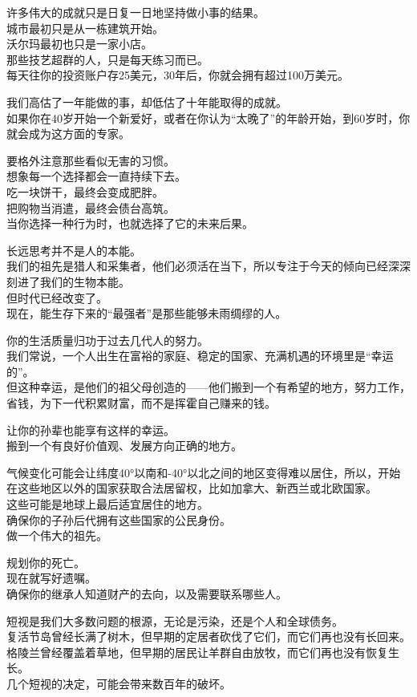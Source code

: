 \documentclass[
]{article}
\begin{document}
许多伟大的成就只是日复一日地坚持做小事的结果。\\
城市最初只是从一栋建筑开始。\\
沃尔玛最初也只是一家小店。\\
那些技艺超群的人，只是每天练习而已。\\
每天往你的投资账户存25美元，30年后，你就会拥有超过100万美元。

我们高估了一年能做的事，却低估了十年能取得的成就。\\
如果你在40岁开始一个新爱好，或者在你认为``太晚了''的年龄开始，到60岁时，你就会成为这方面的专家。

要格外注意那些看似无害的习惯。\\
想象每一个选择都会一直持续下去。\\
吃一块饼干，最终会变成肥胖。\\
把购物当消遣，最终会债台高筑。\\
当你选择一种行为时，也就选择了它的未来后果。

长远思考并不是人的本能。\\
我们的祖先是猎人和采集者，他们必须活在当下，所以专注于今天的倾向已经深深刻进了我们的生物本能。\\
但时代已经改变了。\\
现在，能生存下来的``最强者''是那些能够未雨绸缪的人。

你的生活质量归功于过去几代人的努力。\\
我们常说，一个人出生在富裕的家庭、稳定的国家、充满机遇的环境里是``幸运的''。\\
但这种幸运，是他们的祖父母创造的------他们搬到一个有希望的地方，努力工作，省钱，为下一代积累财富，而不是挥霍自己赚来的钱。

让你的孙辈也能享有这样的幸运。\\
搬到一个有良好价值观、发展方向正确的地方。

气候变化可能会让纬度40°以南和-40°以北之间的地区变得难以居住，所以，开始在这些地区以外的国家获取合法居留权，比如加拿大、新西兰或北欧国家。\\
这些可能是地球上最后适宜居住的地方。\\
确保你的子孙后代拥有这些国家的公民身份。\\
做一个伟大的祖先。

规划你的死亡。\\
现在就写好遗嘱。\\
确保你的继承人知道财产的去向，以及需要联系哪些人。

短视是我们大多数问题的根源，无论是污染，还是个人和全球债务。\\
复活节岛曾经长满了树木，但早期的定居者砍伐了它们，而它们再也没有长回来。\\
格陵兰曾经覆盖着草地，但早期的居民让羊群自由放牧，而它们再也没有恢复生长。\\
几个短视的决定，可能会带来数百年的破坏。
\end{document}
